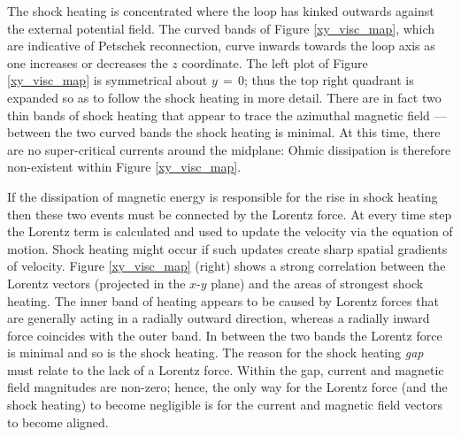 \documentclass{./packages/rs/rsproca}
\begin{document}
The shock heating is concentrated where the loop has kinked outwards against the external potential field. The curved bands of Figure \ref{xy_visc_map}, which are indicative of Petschek reconnection, curve inwards towards the loop axis as one increases or decreases the $z$ coordinate. The left plot of Figure \ref{xy_visc_map} is symmetrical about $y\,{=}\,0$; thus the top right quadrant is expanded so as to follow the shock heating in more detail. There are in fact two thin bands of shock heating that appear to trace the azimuthal magnetic field --- between the two curved bands the shock heating is minimal. At this time, there are no super-critical currents around the midplane: Ohmic dissipation is therefore non-existent within Figure \ref{xy_visc_map}. 

If the dissipation of magnetic energy is responsible for the rise in shock heating then these two events must be connected by the Lorentz force. At every time step the Lorentz term is calculated and used to update the velocity via the equation of motion. Shock heating might occur if such updates create sharp spatial gradients of velocity. Figure \ref{xy_visc_map} (right) shows a strong correlation between the Lorentz vectors (projected in the $x$-$y$ plane) and the areas of strongest shock heating. The inner band of heating appears to be caused by Lorentz forces that are generally acting in a radially outward direction, whereas a radially inward force coincides with the outer band. In between the two bands the Lorentz force is minimal and so is the shock heating. The reason for the shock heating \textit{gap} must relate to the lack of a Lorentz force. Within the gap, current and magnetic field magnitudes are non-zero; hence, the only way for the Lorentz force (and the shock heating) to become negligible is for the current and magnetic field vectors to become aligned. 
\end{document}

